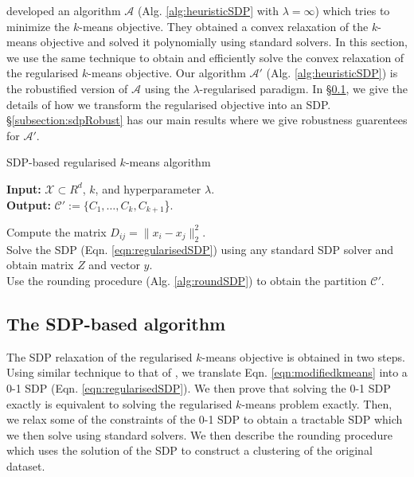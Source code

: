 \documentclass[12pt]{article}
\newcommand{\mc}{\mathcal}
\begin{document}
\cite{peng2007approximating} developed an algorithm $\mc A$ (Alg. \ref{alg:heuristicSDP} with $\lambda = \infty$) which tries to minimize the $k$-means objective. They obtained a convex relaxation of the $k$-means objective and solved it polynomially using standard solvers. In this section, we use the same technique to obtain and efficiently solve the convex relaxation of the regularised $k$-means objective. Our algorithm $\mc A'$ (Alg. \ref{alg:heuristicSDP}) is the robustified version of $\mc A$ using the $\lambda$-regularised paradigm. In \S \ref{subsection:sdpAlg}, we give the details of how we transform the regularised objective into an SDP. \S \ref{subsection:sdpRobust} has our main results where we give robustness guarentees for $\mc A'$.    

\begin{algorithm}[t]
\caption{SDP-based regularised $k$-means algorithm}
\label{alg:heuristicSDP}
	\textbf{Input: }{ $\mc{X} \subset R^d$, $k$, and hyperparameter $\lambda$.} \\
	\textbf{Output: }{$\mc C' := \{C_1, \ldots, C_k, C_{k+1}$\}.}
	
	Compute the matrix $D_{ij} = \|x_i-x_j\|^2_2$.\\
	Solve the SDP (Eqn. \ref{eqn:regularisedSDP}) using any standard SDP solver and obtain matrix $Z$ and vector $y$.\\
	Use the rounding procedure (Alg. \ref{alg:roundSDP}) to obtain the partition $\mc C'$. 
\end{algorithm}

 
\subsection{The SDP-based algorithm}
\label{subsection:sdpAlg}
The SDP relaxation of the regularised $k$-means objective is obtained in two steps. Using similar technique to that of \cite{peng2007approximating}, we translate Eqn. \ref{eqn:modifiedkmeans} into a 0-1 SDP (Eqn. \ref{eqn:regularisedSDP}). We then prove that solving the 0-1 SDP exactly is equivalent to solving the regularised $k$-means problem exactly. Then, we relax some of the constraints of the 0-1 SDP to obtain a tractable SDP which we then solve using standard solvers. We then describe the rounding procedure which uses the solution of the SDP to construct a clustering of the original dataset. 
\end{document}
